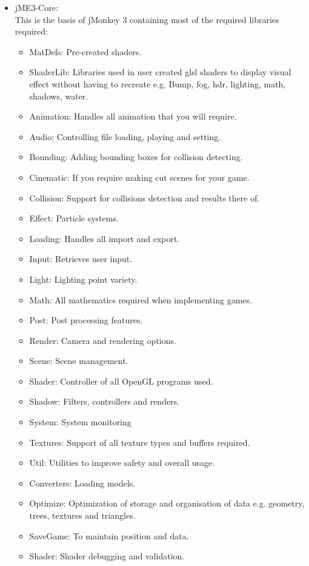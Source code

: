 \documentclass[letterpaper]{article}
\begin{document}
\begin{itemize}
				\item jME3-Core: \\
					This is the basis of jMonkey 3 containing most of the required libraries required:
					\begin{itemize}
						\item MatDefs: Pre-created shaders.
						\item ShaderLib: Libraries used in user created glsl shaders to display visual effect without having to recreate e.g. Bump, fog, hdr, lighting, math, shadows, water.
						\item Animation: Handles all animation that you will require.
						\item Audio: Controlling file loading, playing and setting.
						\item Bounding: Adding bounding boxes for collision detecting.
						\item Cinematic: If you require making cut scenes for your game.
						\item Collision: Support for collisions detection and results there of.
						\item Effect: Particle systems.
						\item Loading: Handles all import and export.
						\item Input: Retrieves user input.
						\item Light: Lighting point variety.
						\item Math: All mathematics required when implementing games.
						\item Post: Post processing features.
						\item Render: Camera and rendering options.
						\item Scene: Scene management.
						\item Shader: Controller of all OpenGL programs used.
						\item Shadow: Filters, controllers and renders.
						\item System: System monitoring 
						\item Textures: Support of all texture types and buffers required.
						\item Util: Utilities to improve safety and overall usage.
						\item Converters: Loading models.
						\item Optimize: Optimization of storage and organisation of data e.g. geometry, trees, textures and triangles.
						\item SaveGame: To maintain position and data.
						\item Shader: Shader debugging and validation.
					\end{itemize}
					

\end{itemize}
\end{document}
